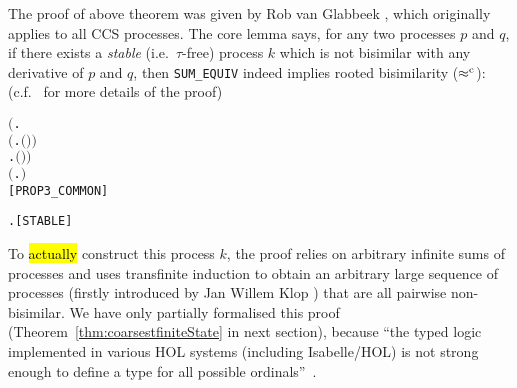 The proof of above theorem was given by Rob van Glabbeek
\cite{van2005characterisation}, which originally applies to all CCS processes.
The core lemma says, for
any two processes $p$ and $q$, if there exists a \emph{stable} (i.e.~$\tau$-free)
 process $k$ which is not bisimilar with any derivative of $p$ and
 $q$, then \texttt{SUM_EQUIV} indeed implies rooted bisimilarity
 ($\mathrel{\approx^{\rm{c}}}$): (c.f.~\cite{Tian:2017wrba} for more details of the proof)
\begin{alltt}
\HOLTokenTurnstile{} \ensuremath{(}\HOLSymConst{\HOLTokenExists{}}.
          \HOLSymConst{\HOLTokenConj{}} \ensuremath{(}\HOLSymConst{\HOLTokenForall{}} .  \HOLTokenWeakTransBegin{}\HOLTokenWeakTransEnd {} \HOLSymConst{\HOLTokenImp{}} \HOLSymConst{\HOLTokenNeg{}}\ensuremath{(} \HOLSymConst{\HOLTokenWeakEQ} \ensuremath{)}\ensuremath{)} \HOLSymConst{\HOLTokenConj{}}
        \HOLSymConst{\HOLTokenForall{}} .  \HOLTokenWeakTransBegin{}\HOLTokenWeakTransEnd {} \HOLSymConst{\HOLTokenImp{}} \HOLSymConst{\HOLTokenNeg{}}\ensuremath{(} \HOLSymConst{\HOLTokenWeakEQ} \ensuremath{)}\ensuremath{)} \HOLSymConst{\HOLTokenImp{}}
   \ensuremath{(}\HOLSymConst{\HOLTokenForall{}}.  \HOLSymConst{\ensuremath{+}}  \HOLSymConst{\HOLTokenWeakEQ}  \HOLSymConst{\ensuremath{+}} \ensuremath{)} \HOLSymConst{\HOLTokenImp{}}
    \HOLSymConst{\HOLTokenObsCongr} \hfill{[PROP3_COMMON]}
\end{alltt}
\begin{alltt}
     \HOLSymConst{\HOLTokenDefEquality{}} \HOLSymConst{\HOLTokenForall{}} .  \HOLTokenTransBegin{}\HOLTokenTransEnd {} \HOLSymConst{\HOLTokenImp{}}  \HOLSymConst{\HOLTokenNotEqual{}} \HOLSymConst{\ensuremath{\tau}}\hfill{[STABLE]}
\end{alltt}

To \hl{actually} construct this process $k$,
 the proof relies on arbitrary infinite sums of 
processes and uses transfinite induction to obtain
an arbitrary large sequence of processes (firstly introduced by Jan
Willem Klop \cite{van2005characterisation})
 that are all pairwise non-bisimilar.
We have only partially formalised
this proof (Theorem~\ref{thm:coarsestfiniteState} in next section), because ``the typed logic
implemented in various HOL systems (including Isabelle/HOL) is not
strong enough to define a type for all possible
ordinals''~\cite{norrish2013ordinals}.

